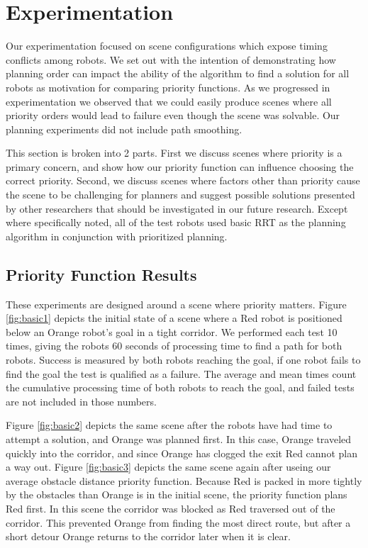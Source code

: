 \documentclass[12pt,journal,compsoc]{IEEEtran}
\begin{document}
\section{Experimentation}
Our experimentation focused on scene configurations which expose timing conflicts among robots. We set out with the intention of demonstrating how planning order can impact the ability of the algorithm to find a solution for all robots as motivation for comparing priority functions. As we progressed in experimentation we observed that we could easily produce scenes where all priority orders would lead to failure even though the scene was solvable. Our planning experiments did not include path smoothing.
\par
This section is broken into 2 parts. First we discuss scenes where priority is a primary concern, and show how our priority function can influence choosing the correct priority. Second, we discuss scenes where factors other than priority cause the scene to be challenging for planners and suggest possible solutions presented by other researchers that should be investigated in our future research. Except where specifically noted, all of the test robots used basic RRT as the planning algorithm in conjunction with prioritized planning.

\subsection{Priority Function Results}\label{sect:priority}
These experiments are designed around a scene where priority matters. Figure \ref{fig:basic1} depicts the initial state of a scene where a Red robot is positioned below an Orange robot's goal in a tight corridor. We performed each test 10 times, giving the robots 60 seconds of processing time to find a path for both robots. Success is measured by both robots reaching the goal, if one robot fails to find the goal the test is qualified as a failure. The average and mean times count  the cumulative processing time of both robots to reach the goal, and failed tests are not included in those numbers.
\par
Figure \ref{fig:basic2} depicts the same scene after the robots have had time to attempt a solution, and Orange was planned first. In this case, Orange traveled quickly into the corridor, and since Orange has clogged the exit Red cannot plan a way out. Figure \ref{fig:basic3} depicts the same scene again after useing our average obstacle distance priority function. Because Red is packed in more tightly by the obstacles than Orange is in the initial scene, the priority function plans Red first. In this scene the corridor was blocked as Red traversed out of the corridor. This prevented Orange from finding the most direct route, but after a short detour Orange returns to the corridor later when it is clear.
\end{document}
